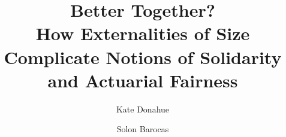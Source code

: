 \documentclass[sigconf]{acmart}
\begin{document}
\title[How Externalities of Size Complicate Notions of Solidarity and Actuarial Fairness]{Better Together?\\ How Externalities of Size Complicate Notions of Solidarity and Actuarial Fairness}

\author{Kate Donahue}

\author{Solon Barocas}


\renewcommand{\shortauthors}{Donahue and Barocas}
\end{document}

